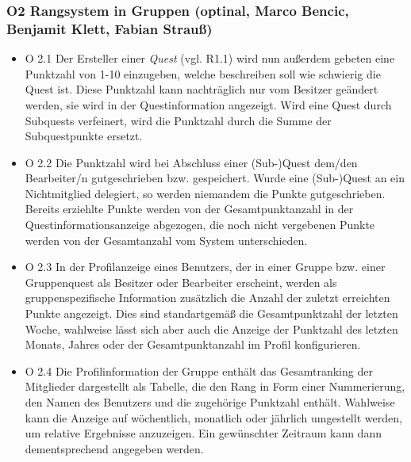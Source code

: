 \documentclass{article}
\begin{document}
\subsubsection{O2 Rangsystem in Gruppen (optinal, Marco Bencic, Benjamit Klett, Fabian Strauß)}

      \begin{itemize}
	\item{O 2.1} Der Ersteller einer \textit{Quest} (vgl. R1.1) wird nun außerdem gebeten eine Punktzahl von 1-10 einzugeben, welche beschreiben soll wie schwierig die Quest ist. 			Diese Punktzahl kann nachträglich nur vom Besitzer geändert werden, sie wird in der Questinformation angezeigt. Wird eine Quest durch Subquests verfeinert, wird die Punktzahl 			durch die Summe der Subquestpunkte ersetzt.

	\item{O 2.2} Die Punktzahl wird bei Abschluss einer (Sub-)Quest dem/den Bearbeiter/n gutgeschrieben bzw. gespeichert. Wurde eine (Sub-)Quest an ein Nichtmitglied delegiert, so 		werden niemandem die Punkte gutgeschrieben. \\
  	Bereits erziehlte Punkte werden von der Gesamtpunktanzahl in der Questinformationsanzeige abgezogen, die noch nicht vergebenen Punkte werden von der Gesamtanzahl vom System 			unterschieden.

        \item{O 2.3} In der Profilanzeige eines Benutzers, der in einer Gruppe bzw. einer Gruppenquest als Besitzer oder Bearbeiter erscheint, werden als gruppenspezifische Information 		zusätzlich die Anzahl der zuletzt erreichten Punkte angezeigt. Dies sind standartgemäß die Gesamtpunktzahl der letzten Woche, wahlweise lässt sich aber auch die Anzeige der Punktzahl 		des letzten Monats, Jahres oder der Gesamtpunktanzahl im Profil konfigurieren.
    		

        \item{O 2.4} Die Profilinformation der Gruppe enthält das Gesamtranking der Mitglieder dargestellt als  Tabelle, die den Rang in Form einer Nummerierung, den Namen des Benutzers und 		die zugehörige Punktzahl enthält.
        Wahlweise kann die Anzeige auf wöchentlich, monatlich oder jährlich umgestellt werden, um relative Ergebnisse anzuzeigen. Ein gewünschter Zeitraum kann dann dementsprechend angegeben 		werden.


\end{itemize}
\end{document}
